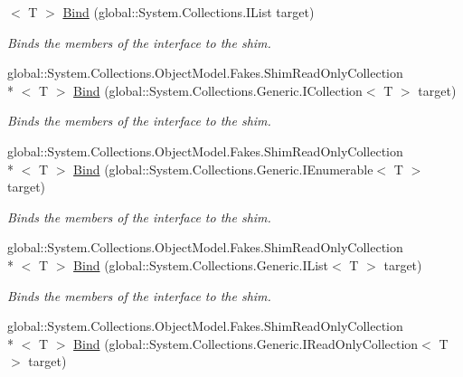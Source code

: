 \begin{DoxyCompactItemize}
$<$ T $>$ \hyperlink{class_system_1_1_collections_1_1_object_model_1_1_fakes_1_1_shim_read_only_collection_3_01_t_01_4_a4012dd83739a5b5c262ea0238abc869e}{Bind} (global\-::\-System.\-Collections.\-I\-List target)
\begin{DoxyCompactList}\small\item\em Binds the members of the interface to the shim.\end{DoxyCompactList}\item 
global\-::\-System.\-Collections.\-Object\-Model.\-Fakes.\-Shim\-Read\-Only\-Collection\\*
$<$ T $>$ \hyperlink{class_system_1_1_collections_1_1_object_model_1_1_fakes_1_1_shim_read_only_collection_3_01_t_01_4_a24d9e957b7d0338a527d076e03bf938f}{Bind} (global\-::\-System.\-Collections.\-Generic.\-I\-Collection$<$ T $>$ target)
\begin{DoxyCompactList}\small\item\em Binds the members of the interface to the shim.\end{DoxyCompactList}\item 
global\-::\-System.\-Collections.\-Object\-Model.\-Fakes.\-Shim\-Read\-Only\-Collection\\*
$<$ T $>$ \hyperlink{class_system_1_1_collections_1_1_object_model_1_1_fakes_1_1_shim_read_only_collection_3_01_t_01_4_a60b38a2b494b61781405a585c3f19cb6}{Bind} (global\-::\-System.\-Collections.\-Generic.\-I\-Enumerable$<$ T $>$ target)
\begin{DoxyCompactList}\small\item\em Binds the members of the interface to the shim.\end{DoxyCompactList}\item 
global\-::\-System.\-Collections.\-Object\-Model.\-Fakes.\-Shim\-Read\-Only\-Collection\\*
$<$ T $>$ \hyperlink{class_system_1_1_collections_1_1_object_model_1_1_fakes_1_1_shim_read_only_collection_3_01_t_01_4_a490fdc833818dc1c0c53dab344804a49}{Bind} (global\-::\-System.\-Collections.\-Generic.\-I\-List$<$ T $>$ target)
\begin{DoxyCompactList}\small\item\em Binds the members of the interface to the shim.\end{DoxyCompactList}\item 
global\-::\-System.\-Collections.\-Object\-Model.\-Fakes.\-Shim\-Read\-Only\-Collection\\*
$<$ T $>$ \hyperlink{class_system_1_1_collections_1_1_object_model_1_1_fakes_1_1_shim_read_only_collection_3_01_t_01_4_a71fd2d796415aaab815f8abd92d90898}{Bind} (global\-::\-System.\-Collections.\-Generic.\-I\-Read\-Only\-Collection$<$ T $>$ target)

\end{DoxyCompactItemize}
